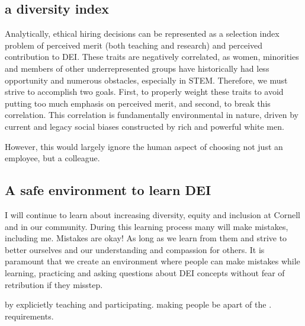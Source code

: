 \documentclass[11pt]{article}
\begin{document}


\subsection*{a diversity index}

Analytically, ethical hiring decisions can be represented as a selection index problem of perceived merit (both teaching and research) and perceived contribution to DEI. These traits are negatively correlated, as women, minorities and members of other underrepresented groups have historically had less opportunity and numerous obstacles, especially in STEM. Therefore, we must strive to accomplish two goals. First, to properly weight these traits to avoid putting too much emphasis on perceived merit, and second, to break this correlation. This correlation is fundamentally environmental in nature, driven by current and legacy social biases constructed by rich and powerful white men. 

However, this would largely ignore the human aspect of choosing not just an employee, but a colleague. 






\subsection*{A safe environment to learn DEI}

I will continue to learn about increasing diversity, equity and inclusion at Cornell and in our community. During this learning process many will make mistakes, including me. Mistakes are okay! As long as we learn from them and strive to better ourselves and our understanding and compassion for others. It is paramount that we create an environment where people can make mistakes while learning, practicing and asking questions about DEI concepts without fear of retribution if they misstep. 

by explicietly teaching and participating. making people be apart of the . requirements. 
\end{document}
